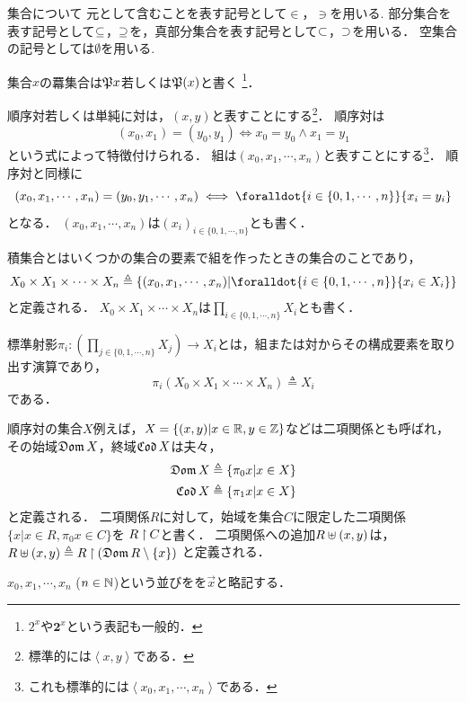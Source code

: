\documentclass[a4paper,titlepage,report,disablejfam]{jsbook}
\begin{document}
\begin{resbonsiblesection}{集合について}{\sakamoto}\label{sc:about-set}
元として含むことを表す記号として$\in$，$\ni$を用いる.  部分集合を表す記号として$\subseteq$，$\supseteq$を，真部分集合を表す記号として$\subset$，$\supset$を用いる． 空集合の記号としては$\emptyset$を用いる.

集合$x$の羃集合は$\mathfrak{P} x$若しくは$\mathfrak{P}(x)$と書く
\footnote{$2^x$や$\boldsymbol{2}^x$という表記も一般的．}．

順序対若しくは単純に対は，$(x,y)$と表すことにする\footnote{標準的には$\left\langle x,y\right\rangle$である．}．
順序対は
\begin{equation}
(x_0,x_1) = (y_0,y_1) \iff x_0 = y_0 \land x_1 = y_1
\end{equation}
という式によって特徴付けられる．
組は$(x_0,x_1,\cdots,x_n)$と表すことにする\footnote{これも標準的には$\left\langle x_0,x_1,\cdots,x_n\right\rangle$である．}．
順序対と同様に
\begin{equation}
(x_0,x_1,\cdots,x_n) = (y_0,y_1,\cdots,x_n) \iff \foralldot{i\in\{0,1,\cdots,n\}}{x_i = y_i}
\end{equation}
となる．
$(x_0,x_1,\cdots,x_n)$は$(x_i)_{i\in\{0,1,\cdots,n\}}$とも書く．

積集合とはいくつかの集合の要素で組を作ったときの集合のことであり，
\begin{equation}
X_0\times X_1\times\cdots\times X_n\triangleq \{(x_0,x_1,\cdots,x_n)|\foralldot{i\in\{0,1,\cdots,n\}}{x_i\in X_i}\}
\end{equation}
と定義される．
$X_0\times X_1\times\cdots\times X_n$は$\prod_{i\in\{0,1,\cdots,n\}} X_i$とも書く．

標準射影$\pi_i:\left(\prod_{j\in\{0,1,\cdots,n\}} X_j\right)\rightarrow X_i$とは，組または対からその構成要素を取り出す演算であり，
\begin{equation}
\pi_i(X_0\times X_1\times\cdots\times X_n)\triangleq X_i
\end{equation}
である．

順序対の集合$X$\jpdash 例えば，$X=\{(x,y)|x\in\mathbb{R},y\in\mathbb{Z}\}$など\jpdash は二項関係とも呼ばれ，
その始域$\mathop{\mathfrak{Dom}} X$，終域$\mathop{\mathfrak{Cod}} X$は夫々，
\begin{align}
    \mathop{\mathfrak{Dom}} X &\triangleq \{\pi_0 x|x\in X\}\\
    \mathop{\mathfrak{Cod}} X &\triangleq \{\pi_1 x|x\in X\}
\end{align}
と定義される．
二項関係$R$に対して，始域を集合$C$に限定した二項関係$\{x|x\in R, \pi_0 x\in C\}$を
$R\mathbin{\upharpoonright}C$と書く．
二項関係への追加$R\uplus\left(x,y\right)$は，
$R\uplus\left(x,y\right)\triangleq R\mathbin{\upharpoonright}\left(\mathop{\mathfrak{Dom}} R\setminus \{x\}\right)$
と定義される．

$x_0,x_1,\cdots,x_n$ ($n\in\mathbb{N}$)という並びをを$\vec{x}$と略記する．

\end{resbonsiblesection}
\end{document}
